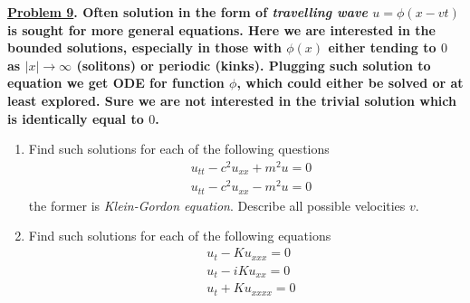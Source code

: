 \documentclass{article}
\theoremstyle{definition}
\newenvironment{boldenv}{\bfseries\boldmath}{}
\begin{document}
\begin{boldenv}
    \underline{Problem 9}. Often solution in the form of \textit{travelling wave} $u=\phi(x-vt)$ is sought for more general equations. Here we are interested in the bounded solutions, especially in those with $\phi(x)$ either tending to $0$ as $|x| \rightarrow \infty$ (solitons) or periodic (kinks). Plugging such solution to equation we get ODE for function $\phi$, which could either be solved or at least explored. Sure we are not interested in the trivial solution which is identically equal to $0$. \begin{enumerate}
        \item Find such solutions for each of the following questions
        \begin{align*}
            & u_{tt} - c^2u_{xx} + m^2u =0 \tag{38}\\
            & u_{tt} - c^2u_{xx} - m^2u =0 \tag{39}
        \end{align*}
        the former is \textit{Klein-Gordon equation}. Describe all possible velocities $v$.
        \item Find such solutions for each of the following equations
        \begin{align*}
            & u_t - Ku_{xxx} = 0 \tag{40} \\
            & u_t - iKu_{xx} = 0 \tag{41}\\
            & u_t + Ku_{xxxx} = 0 \tag{42}
        \end{align*}
    \end{enumerate}
\end{boldenv}
\end{document}
